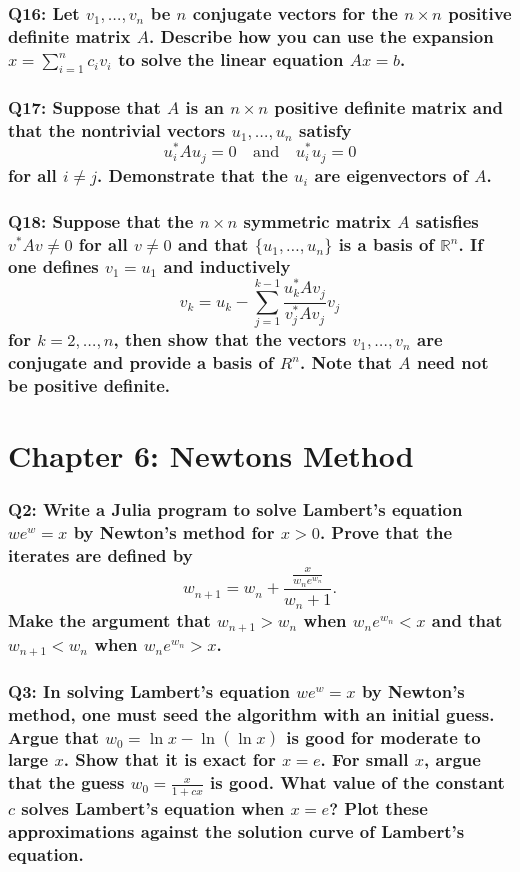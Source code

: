 \documentclass{article}
\begin{document}
\subsubsection*{Q16: Let \(v_1, \ldots, v_n\) be \(n\) conjugate vectors for the \(n \times n\) positive definite matrix \(A\). Describe how you can use the expansion \(x = \sum_{i=1}^n c_i v_i\) to solve the linear equation \(Ax = b\).}

\subsubsection*{Q17: Suppose that \(A\) is an \(n \times n\) positive definite matrix and that the nontrivial vectors \(u_1, \ldots, u_n\) satisfy
\[ u_i^* A u_j = 0 \quad \text{and} \quad u_i^* u_j = 0 \]
for all \(i \neq j\). Demonstrate that the \(u_i\) are eigenvectors of \(A\).}

\subsubsection*{Q18: Suppose that the \(n \times n\) symmetric matrix \(A\) satisfies \(v^* A v \neq 0\) for all \(v \neq 0\) and that \(\{u_1, \ldots, u_n\}\) is a basis of \(\mathbb{R}^n\). If one defines \(v_1 = u_1\) and inductively
\[ v_k = u_k - \sum_{j=1}^{k-1} \frac{u_k^* A v_j}{v_j^* A v_j} v_j \]
for \(k = 2, \ldots, n\), then show that the vectors \(v_1, \ldots, v_n\) are conjugate and provide a basis of \({R}^n\). Note that \(A\) need not be positive definite.}

\newpage
\section*{Chapter 6: Newtons Method}
\subsubsection*{Q2: Write a Julia program to solve Lambert’s equation \(we^w = x\) by Newton’s method for \(x > 0\). Prove that the iterates are defined by
\[ w_{n+1} = w_n + \frac{\frac{x}{w_n e^{w_n}}}{w_n + 1}. \]
Make the argument that \(w_{n+1} > w_n\) when \(w_n e^{w_n} < x\) and that \(w_{n+1} < w_n\) when \(w_n e^{w_n} > x\).}

\subsubsection*{Q3: In solving Lambert’s equation \(we^w = x\) by Newton’s method, one must seed the algorithm with an initial guess. Argue that \(w_0 = \ln x - \ln(\ln x)\) is good for moderate to large \(x\). Show that it is exact for \(x = e\). For small \(x\), argue that the guess \(w_0 = \frac{x}{1 + cx}\) is good. What value of the constant \(c\) solves Lambert’s equation when \(x = e\)? Plot these approximations against the solution curve of Lambert’s equation.}
\end{document}
